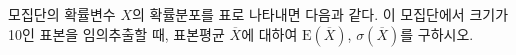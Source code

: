 모집단의 확률변수 $X$의 확률분포를 표로 나타내면 다음과 같다. 이 모집단에서 크기가 10인 표본을 임의추출할 때, 표본평균 $\overline{X}$에 대하여 $\mathrm{E}(\overline{X})$, $\sigma(\overline{X})$를 구하시오.
\par\smallskip\begin{center}\resizebox{\ifdim\width>\linewidth\linewidth\else\width\fi}{!}{}\end{center}
